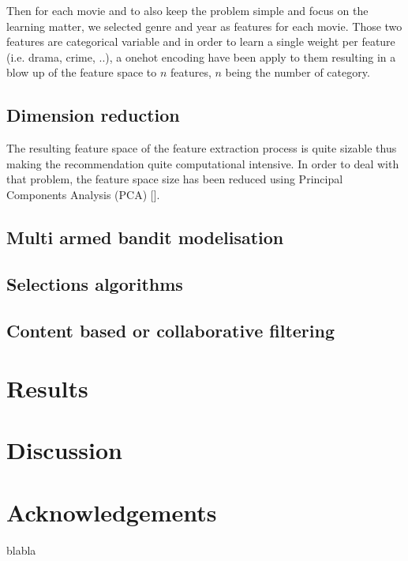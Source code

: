 \documentclass[letterpaper]{article}
\begin{document}
Then for each movie and to also keep the problem simple and focus on the learning matter, we selected genre and year as features for each movie. Those two features are categorical variable and in order to learn a single weight per feature (i.e. drama, crime, ..), a onehot encoding have been apply to them resulting in a blow up of the feature space to $n$ features, $n$ being the number of category.

\begin{table}[h]
\vskip 0.25cm
\caption{Movise feature space}
\end{table}


\subsection{Dimension reduction}

The resulting feature space of the feature extraction process is quite sizable thus making the recommendation quite computational intensive.
In order to deal with that problem, the feature space size has been reduced using Principal Components Analysis (PCA) [\cite{principalcompanalysis}].



\subsection{Multi armed bandit modelisation}


\subsection{Selections algorithms}



\subsection{Content based or collaborative filtering}



\section{Results}


\section{Discussion}


\section{Acknowledgements}

blabla

\footnotesize


\end{document}
